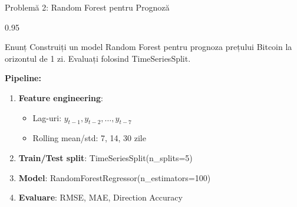 \documentclass[9pt, aspectratio=169, t]{beamer}
\begin{document}
\begin{frame}{Problemă 2: Random Forest pentru Prognoză}
    \begin{cminipage}{0.95\textwidth}
    \begin{block}{Enunț}
        Construiți un model Random Forest pentru prognoza prețului Bitcoin la orizontul de 1 zi. Evaluați folosind TimeSeriesSplit.
    \end{block}

    \vspace{0.3cm}
    \textbf{Pipeline:}
    \begin{enumerate}\setlength{\itemsep}{0pt}
        \item \textbf{Feature engineering}:
            \begin{itemize}\setlength{\itemsep}{0pt}
                \item Lag-uri: $y_{t-1}, y_{t-2}, \ldots, y_{t-7}$
                \item Rolling mean/std: 7, 14, 30 zile
            \end{itemize}
        \item \textbf{Train/Test split}: TimeSeriesSplit(n\_splits=5)
        \item \textbf{Model}: RandomForestRegressor(n\_estimators=100)
        \item \textbf{Evaluare}: RMSE, MAE, Direction Accuracy
    \end{enumerate}
    \end{cminipage}
\end{frame}
\end{document}
